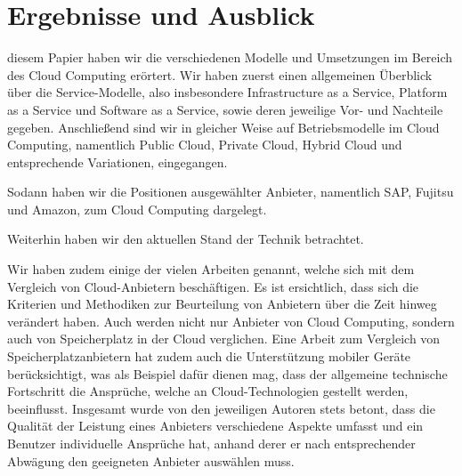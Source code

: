 \section{Ergebnisse und Ausblick}
\label{sec_conclusion}

 diesem Papier haben wir die verschiedenen Modelle und Umsetzungen im Bereich des Cloud Computing erörtert. 
Wir haben zuerst einen allgemeinen Überblick über die Service-Modelle, also insbesondere Infrastructure as a Service, Platform as a Service und Software as a Service, sowie deren jeweilige Vor- und Nachteile gegeben. 
Anschließend sind wir in gleicher Weise auf Betriebsmodelle im Cloud Computing, namentlich Public Cloud, Private Cloud, Hybrid Cloud und entsprechende Variationen, eingegangen. 

Sodann haben wir die Positionen ausgewählter Anbieter, namentlich SAP, Fujitsu und Amazon, zum Cloud Computing dargelegt.

Weiterhin haben wir den aktuellen Stand der Technik betrachtet.


Wir haben zudem einige der vielen Arbeiten genannt, welche sich mit dem Vergleich von Cloud-Anbietern beschäftigen. 
Es ist ersichtlich, dass sich die Kriterien und Methodiken zur Beurteilung von Anbietern über die Zeit hinweg verändert haben. 
Auch werden nicht nur Anbieter von Cloud Computing, sondern auch von Speicherplatz in der Cloud verglichen. 
Eine Arbeit zum Vergleich von Speicherplatzanbietern hat zudem auch die Unterstützung mobiler Geräte berücksichtigt, was als Beispiel dafür dienen mag, dass der allgemeine technische Fortschritt die Ansprüche, welche an Cloud-Technologien gestellt werden, beeinflusst. 
Insgesamt wurde von den jeweiligen Autoren stets betont, dass die Qualität der Leistung eines Anbieters verschiedene Aspekte umfasst und ein Benutzer individuelle Ansprüche hat, anhand derer er nach entsprechender Abwägung den geeigneten Anbieter auswählen muss. 

